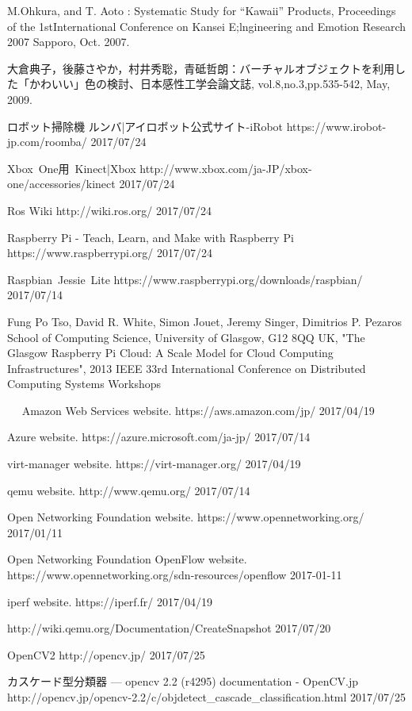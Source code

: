 \documentclass[a4paper, twocolumn]{jarticle}
\begin{document}
\begin{thebibliography}{10}


M.Ohkura, and T. Aoto : Systematic Study for “Kawaii” Products, Proceedings of the 1stInternational Conference on Kansei E;lngineering and Emotion Research 2007 Sapporo, Oct. 2007.

  大倉典子，後藤さやか，村井秀聡，青砥哲朗：バーチャルオブジェクトを利用した「かわいい」色の検討、日本感性工学会論文誌, vol.8,no.3,pp.535-542, May, 2009.

    ロボット掃除機 ルンバ|アイロボット公式サイト-iRobot https://www.irobot-jp.com/roomba/ 2017/07/24

  Xbox\ One用\ Kinect|Xbox http://www.xbox.com/ja-JP/xbox-one/accessories/kinect 2017/07/24

  Ros Wiki http://wiki.ros.org/ 2017/07/24

  Raspberry Pi - Teach, Learn, and Make with Raspberry Pi https://www.raspberrypi.org/ 2017/07/24

    Raspbian\ Jessie\ Lite https://www.raspberrypi.org/downloads/raspbian/ 2017/07/14

    Fung Po Tso, David R. White, Simon Jouet, Jeremy Singer, Dimitrios P. Pezaros School of Computing Science, University of Glasgow, G12 8QQ UK, "The Glasgow Raspberry Pi Cloud: A Scale Model for Cloud Computing Infrastructures", 2013 IEEE 33rd International Conference on Distributed Computing Systems Workshops

　  Amazon Web Services website. https://aws.amazon.com/jp/ 2017/04/19

    Azure website. https://azure.microsoft.com/ja-jp/ 2017/07/14

      virt-manager website. https://virt-manager.org/ 2017/04/19

      qemu website. http://www.qemu.org/ 2017/07/14

      Open Networking Foundation website. https://www.opennetworking.org/ 2017/01/11

      Open Networking Foundation OpenFlow website. https://www.opennetworking.org/sdn-resources/openflow 2017-01-11

        iperf website.  https://iperf.fr/ 2017/04/19

   http://wiki.qemu.org/Documentation/CreateSnapshot 2017/07/20

  OpenCV2 http://opencv.jp/ 2017/07/25

  カスケード型分類器 — opencv 2.2 (r4295) documentation - OpenCV.jp http://opencv.jp/opencv-2.2/c/objdetect\_cascade\_classification.html  2017/07/25

\end{thebibliography}
\end{document}
